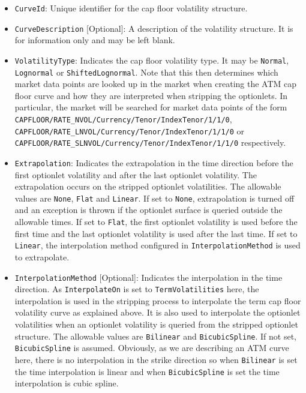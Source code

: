 \begin{itemize}
\item
\lstinline!CurveId!: Unique identifier for the cap floor volatility structure.

\item \lstinline!CurveDescription! [Optional]:
A description of the volatility structure. It is for information only and may be left blank.

\item \lstinline!VolatilityType!:
Indicates the cap floor volatility type. It may be \lstinline!Normal!, \lstinline!Lognormal! or \lstinline!ShiftedLognormal!. Note that this then determines which market data points are looked up in the market when creating the ATM cap floor curve and how they are interpreted when stripping the optionlets. In particular, the market will be searched for market data points of the form \lstinline!CAPFLOOR/RATE_NVOL/Currency/Tenor/IndexTenor/1/1/0!, \lstinline!CAPFLOOR/RATE_LNVOL/Currency/Tenor/IndexTenor/1/1/0! or \lstinline!CAPFLOOR/RATE_SLNVOL/Currency/Tenor/IndexTenor/1/1/0! respectively.

\item \lstinline!Extrapolation!:
Indicates the extrapolation in the time direction before the first optionlet volatility and after the last optionlet volatility. The extrapolation occurs on the stripped optionlet volatilities. The allowable values are \lstinline!None!, \lstinline!Flat! and \lstinline!Linear!. If set to \lstinline!None!, extrapolation is turned off and an exception is thrown if the optionlet surface is queried outside the allowable times. If set to \lstinline!Flat!, the first optionlet volatility is used before the first time and the last optionlet volatility is used after the last time. If set to \lstinline!Linear!, the interpolation method configured in \lstinline!InterpolationMethod! is used to extrapolate.

\item \lstinline!InterpolationMethod! [Optional]:
Indicates the interpolation in the time direction. As \lstinline!InterpolateOn! is set to \lstinline!TermVolatilities! here, the interpolation is used in the stripping process to interpolate the term cap floor volatility curve as explained above. It is also used to interpolate the optionlet volatilities when an optionlet volatility is queried from the stripped optionlet structure. The allowable values are \lstinline!Bilinear! and \lstinline!BicubicSpline!. If not set, \lstinline!BicubicSpline! is assumed. Obviously, as we are describing an ATM curve here, there is no interpolation in the strike direction so when \lstinline!Bilinear! is set the time interpolation is linear and when \lstinline!BicubicSpline! is set the time interpolation is cubic spline.


\end{itemize}
